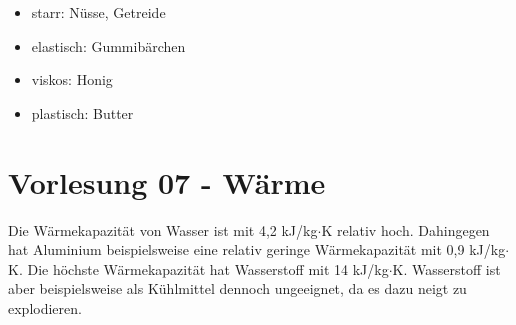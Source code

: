\documentclass[a4paper,10pt,twoside]{article}
\begin{document}
\begin{itemize}
\item starr: Nüsse, Getreide
\item elastisch: Gummibärchen
\item viskos: Honig
\item plastisch: Butter
\end{itemize}




\newpage

\section*{Vorlesung 07 - Wärme}\addtocounter{section}{1}







Die Wärmekapazität von Wasser ist mit 4,2 kJ/kg$\cdot$K relativ hoch. Dahingegen hat Aluminium beispielsweise eine relativ geringe Wärmekapazität mit 0,9 kJ/kg$\cdot$K. Die höchste Wärmekapazität hat Wasserstoff mit 14 kJ/kg$\cdot$K. Wasserstoff ist aber beispielsweise als Kühlmittel dennoch ungeeignet, da es dazu neigt zu explodieren. 
\end{document}

